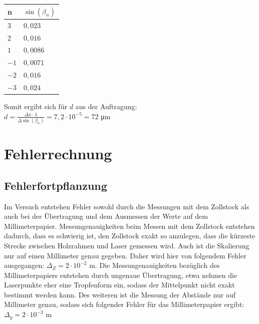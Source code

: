 \documentclass[12pt,a4paper,titlepage,headinclude,bibtotoc]{scrartcl}
\begin{document}
\begin{table} [h!]
\centering
\begin{tabular}{|p{4 cm}||p{4 cm}|}
        \hline
		n & $\sin(\beta_n)$ \\
         \hline 
         $3$ & $0,023$  \\
         \hline
         $2$ & $0,016$ \\
         \hline
         $1$ & $0,0086$\\
         \hline
         $-1$ & $0,0071$\\
         \hline
         $-2$ & $0,016$  \\
         \hline             
         $-3$ & $0,024$   \\
         \hline
\end{tabular}
\end{table}



Somit ergibt sich für $d$ aus der Auftragung:\\

$ d= \frac{\Delta n \cdot \lambda}{\Delta \sin(\beta_n)} = 7,2\cdot 10^{-5} = 72$ \si\micro m





\section{Fehlerrechnung}
\subsection{Fehlerfortpflanzung}
Im Versuch entstehen Fehler sowohl durch die Messungen mit dem Zollstock als auch bei der Übertragung und dem Ausmessen der Werte auf dem Millimeterpapier. Messungenauigkeiten beim Messen mit dem Zollstock entstehen dadurch, dass es schwierig ist, den Zollstock exakt so anzulegen, dass die kürzeste Strecke zwischen Holzrahmen und Laser gemessen wird. Auch ist die Skalierung nur auf einen Millimeter genau gegeben. Daher wird hier von folgendem Fehler ausgegangen: $\Delta_{Z}={2} \cdot{10^{-2}}$ m. Die Messungenauigkeiten bezüglich des Millimeterpapiers entstehen durch ungenaue Übertragung, etwa nehmen die Laserpunkte eher eine Tropfenform ein, sodass der Mittelpunkt nicht exakt bestimmt werden kann. Des weiteren ist die Messung der Abstände nur auf Millimeter genau, sodass sich folgender Fehler für das Millimeterpapier ergibt:\\
 $\Delta_{y}={2} \cdot {10^{-3}}$ m \\
\end{document}
